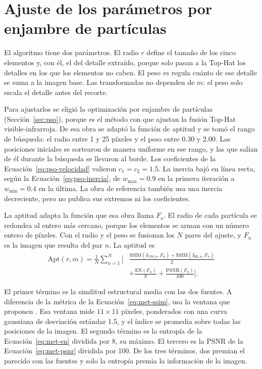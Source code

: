 \section{Ajuste de los parámetros por enjambre de partículas}
\label{sec:ajuste}

El algoritmo tiene dos parámetros. El radio $r$ define el tamaño de los cinco elementos y, con él, el
del detalle extraído, porque solo pasan a la Top-Hat los detalles en los que los elementos no caben. El
peso $m$ regula cuánto de ese detalle se suma a la imagen base. Las transformadas no dependen de $m$:
el peso solo escala el detalle antes del recorte.

Para ajustarlos se eligió la optimización por enjambre de partículas (Sección~\ref{sec:pso}), porque
es el método con que \textcite{ortegarodriguez2025} ajustan la fusión Top-Hat visible-infrarroja. De
esa obra se adaptó la función de aptitud y se tomó el rango de búsqueda: el radio
entre 1 y 25 píxeles y el peso entre 0.30 y 2.00. Las posiciones iniciales se sortearon de manera
uniforme en ese rango, y las que salían de él durante la búsqueda se llevaron al borde. Los coeficientes de la
Ecuación~\eqref{eq:pso-velocidad} valieron $c_1 = c_2 = 1.5$. La inercia bajó en línea recta, según la
Ecuación~\eqref{eq:pso-inercia}, de $w_{\max} = 0.9$ en la primera iteración a $w_{\min} = 0.4$ en la
última. La obra de referencia también usa una inercia decreciente, pero no publica sus extremos ni los
coeficientes.

La aptitud adapta la función que esa obra llama $F_o$. El radio de cada partícula se redondea al entero
más cercano, porque los elementos se arman con un número entero de píxeles. Con el radio y el peso se
fusionan los $N$ pares del ajuste, y $F_n$ es la imagen que resulta del par $n$. La aptitud es
\begin{equation} \begin{aligned} \mathrm{Apt}(r, m) = \frac{1}{N}\sum_{n=1}^{N}\biggl[ & \frac{\mathrm{SSIM}(I_{\mathrm{VIS},n}, F_n) + \mathrm{SSIM}(I_{\mathrm{IR},n}, F_n)}{2} \\
 & + \frac{\mathrm{EN}(F_n)}{8} + \frac{\mathrm{PSNR}(F_n)}{100}\biggr]. \end{aligned} \label{eq:aptitud} \end{equation}

El primer término es la similitud estructural media con las dos fuentes. A diferencia de la métrica de
la Ecuación~\eqref{eq:met-ssim}, usa la ventana que proponen \textcite{wang2004}. Esa ventana mide
$11 \times 11$ píxeles, ponderados con una curva gaussiana de desviación estándar 1.5, y el índice se
promedia sobre todas las posiciones de la imagen. El segundo término es la entropía de la
Ecuación~\eqref{eq:met-en} dividida por 8, su máximo. El tercero es la PSNR de la
Ecuación~\eqref{eq:met-psnr} dividida por 100. De los tres términos, dos premian el parecido con las
fuentes y solo la entropía premia la información de la imagen.

